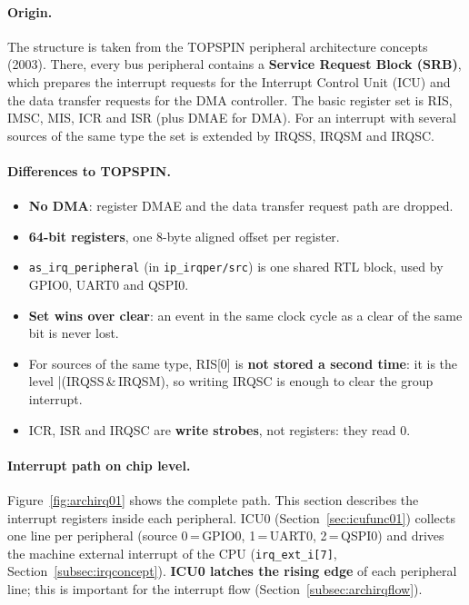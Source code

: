 \paragraph{Origin.}
The structure is taken from the TOPSPIN peripheral architecture concepts
(2003). There, every bus peripheral contains a \textbf{Service Request Block
(SRB)}, which prepares the interrupt requests for the Interrupt Control Unit
(ICU) and the data transfer requests for the DMA controller. The basic register
set is RIS, IMSC, MIS, ICR and ISR (plus DMAE for DMA). For an interrupt with
several sources of the same type the set is extended by IRQSS, IRQSM and IRQSC.

\paragraph{Differences to TOPSPIN.}
\begin{itemize}
  \item \textbf{No DMA}: register DMAE and the data transfer request path are dropped.
  \item \textbf{64-bit registers}, one 8-byte aligned offset per register.
  \item \texttt{as\_irq\_peripheral} (in \texttt{ip\_irqper/src}) is one shared
    RTL block, used by GPIO0, UART0 and QSPI0.
  \item \textbf{Set wins over clear}: an event in the same clock cycle as a
    clear of the same bit is never lost.
  \item For sources of the same type, RIS[0] is \textbf{not stored a second
    time}: it is the level |(IRQSS\,\&\,IRQSM), so writing IRQSC is enough to
    clear the group interrupt.
  \item ICR, ISR and IRQSC are \textbf{write strobes}, not registers: they read 0.
\end{itemize}

\paragraph{Interrupt path on chip level.}
Figure~\ref{fig:archirq01} shows the complete path. This section describes the
interrupt registers inside each peripheral. ICU0 (Section~\ref{sec:icufunc01})
collects one line per peripheral (source 0\,=\,GPIO0, 1\,=\,UART0, 2\,=\,QSPI0)
and drives the machine external interrupt of the CPU
(\texttt{irq\_ext\_i[7]}, Section~\ref{subsec:irqconcept}).
\textbf{ICU0 latches the rising edge} of each peripheral line; this is
important for the interrupt flow (Section~\ref{subsec:archirqflow}).

